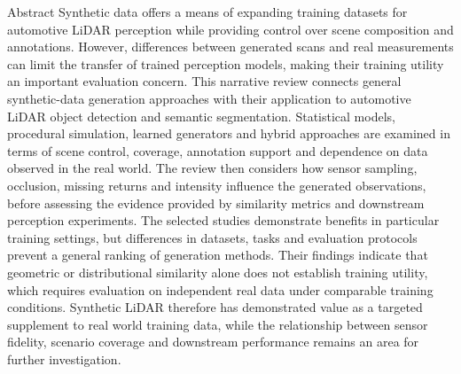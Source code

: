 \begin{researchbox}{Abstract}
Synthetic data offers a means of expanding training datasets for automotive LiDAR perception while providing control over scene composition and annotations. However, differences between generated scans and real measurements can limit the transfer of trained perception models, making their training utility an important evaluation concern. This narrative review connects general synthetic-data generation approaches with their application to automotive LiDAR object detection and semantic segmentation. Statistical models, procedural simulation, learned generators and hybrid approaches are examined in terms of scene control, coverage, annotation support and dependence on data observed in the real world. The review then considers how sensor sampling, occlusion, missing returns and intensity influence the generated observations, before assessing the evidence provided by similarity metrics and downstream perception experiments. The selected studies demonstrate benefits in particular training settings, but differences in datasets, tasks and evaluation protocols prevent a general ranking of generation methods. Their findings indicate that geometric or distributional similarity alone does not establish training utility, which requires evaluation on independent real data under comparable training conditions. Synthetic LiDAR therefore has demonstrated value as a targeted supplement to real world training data, while the relationship between sensor fidelity, scenario coverage and downstream performance remains an area for further investigation.
\end{researchbox}
